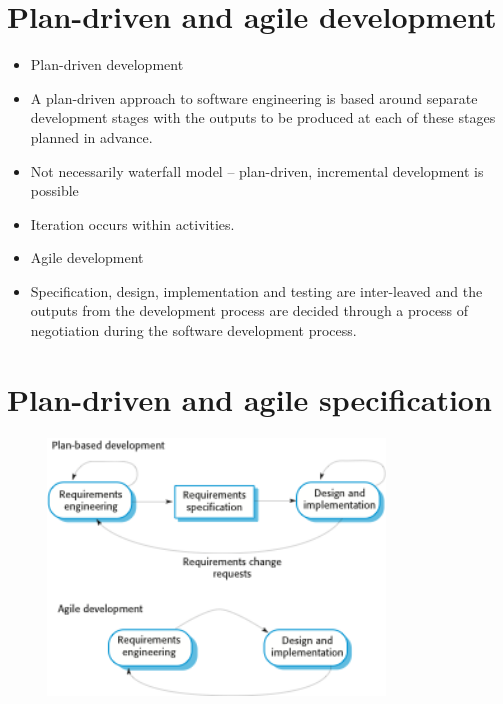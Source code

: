  \section{ Plan-driven and agile development}
 \begin{itemize}

\item Plan-driven development

\item A plan-driven approach to software engineering is based around separate development stages with the outputs to be produced at each of these stages planned in advance.
\item Not necessarily waterfall model – plan-driven, incremental development is possible
\item Iteration occurs within activities. \item Agile development
\item Specification, design, implementation and testing are inter-leaved and the outputs from the development process are decided through a process of negotiation during the software development process.

\end{itemize}
\newpage
\section{ Plan-driven and agile specification}
\begin{figure}[h!]
    \centering
    \includegraphics[width = 0.8\textwidth]{./figures/L2_1.png}
    \caption{}
    \label{fig:L2_1}
\end{figure}


